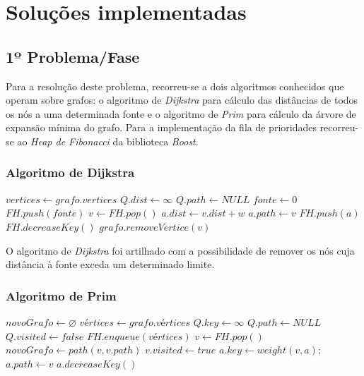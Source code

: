 \documentclass[a4paper,12pt,titlepage]{article}
\begin{document}
\section{Soluções implementadas}
\subsection{1º Problema/Fase}
Para a resolução deste problema, recorreu-se a dois algoritmos conhecidos que operam sobre grafos: o algoritmo de \emph{Dijkstra} para cálculo das distâncias de todos os nós a uma determinada fonte e o algoritmo de \emph{Prim} para cálculo da árvore de expansão mínima do grafo. Para a implementação da fila de prioridades recorreu-se ao \emph{Heap de Fibonacci} da biblioteca \emph{Boost}. 
\subsubsection{Algoritmo de Dijkstra}

\begin{algorithmic}[1]
\State $vertices \gets grafo.vertices$
\State $Q.dist \gets \infty$
\State $Q.path \gets NULL$
\EndFor
\State $fonte \gets 0$
\State $FH.push(fonte)$
\State $v \gets FH.pop()$
	\State $a.dist \gets v.dist + w$
	\State $a.path \gets v$
		\State $FH.push(a)$
	\Else
		\State $FH.decreaseKey()$
	\EndIf
\EndIf
\EndFor
\EndWhile
\EndProcedure
{}
\State $grafo.removeVertice(v)$
\EndIf
\EndFor
\EndProcedure
\end{algorithmic}

O algoritmo de \emph{Dijkstra} foi artilhado com a possibilidade de remover os nós cuja distância à fonte exceda um determinado limite.

\subsubsection{Algoritmo de Prim}
\begin{algorithmic}[1]
\State $novoGrafo \gets \varnothing$
\State $vértices \gets grafo.vértices$
\State $Q.key \gets \infty$
\State $Q.path \gets NULL$
\State $Q.visited \gets false$
\EndFor
\State $FH.enqueue(vértices)$
\State $v \gets FH.pop()$
\State $novoGrafo \gets path(v, v.path)$
\State $v.visited \gets true$
\State $a.key \gets weight(v,a)$;
\State $a.path \gets v$
\State $a.decreaseKey()$
\EndIf
\EndFor
\EndWhile
\EndProcedure

\end{algorithmic}
\end{document}
